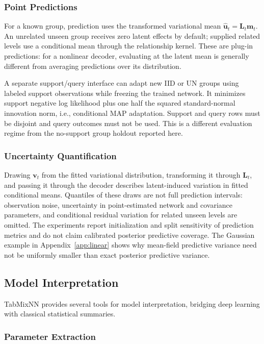 \documentclass[12pt,a4paper]{article}
\begin{document}
\subsubsection{Point Predictions}
For a known group, prediction uses the transformed variational mean $\widehat{\mathbf u}_t=\mathbf L_t\mathbf m_t$. An unrelated unseen group receives zero latent effects by default; supplied related levels use a conditional mean through the relationship kernel. These are plug-in predictions: for a nonlinear decoder, evaluating at the latent mean is generally different from averaging predictions over its distribution.

A separate support/query interface can adapt new IID or UN groups using labeled support observations while freezing the trained network. It minimizes support negative log likelihood plus one half the squared standard-normal innovation norm, i.e., conditional MAP adaptation. Support and query rows must be disjoint and query outcomes must not be used. This is a different evaluation regime from the no-support group holdout reported here.

\subsubsection{Uncertainty Quantification}
Drawing $\mathbf v_t$ from the fitted variational distribution, transforming it through $\mathbf L_t$, and passing it through the decoder describes latent-induced variation in fitted conditional means. Quantiles of these draws are not full prediction intervals: observation noise, uncertainty in point-estimated network and covariance parameters, and conditional residual variation for related unseen levels are omitted. The experiments report initialization and split sensitivity of prediction metrics and do not claim calibrated posterior predictive coverage. The Gaussian example in Appendix~\ref{app:linear} shows why mean-field predictive variance need not be uniformly smaller than exact posterior predictive variance.

\subsection{Model Interpretation}
\label{sec:interpretation}

TabMixNN provides several tools for model interpretation, bridging deep learning with classical statistical summaries.

\subsubsection{Parameter Extraction}
\end{document}
